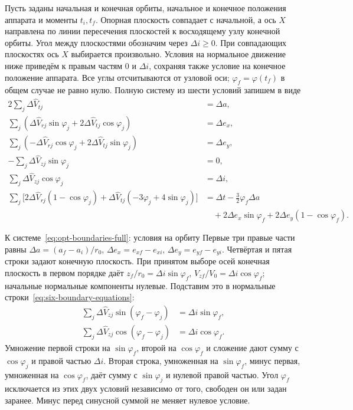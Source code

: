 Пусть заданы начальная и конечная орбиты, начальное и конечное
положения аппарата и моменты $t_i,t_f$.
Опорная плоскость совпадает с начальной, а ось $X$ направлена
по линии пересечения плоскостей к восходящему узлу конечной орбиты.
Угол между плоскостями обозначим через $\Delta i\geq0$.
При совпадающих плоскостях ось $X$ выбирается произвольно.
Условия на нормальное движение ниже приведём к правым частям
$0$ и $\Delta i$, сохраняя также условие на конечное положение аппарата.
Все углы отсчитываются от узловой оси;
$\varphi_f=\varphi(t_f)$ в общем случае не равно нулю.
Полную систему из шести условий запишем в виде
\begin{equation}
\begin{aligned}
 2\sum_j\Delta\widehat V_{tj}&=\Delta a,\\
 \sum_j(\Delta\widehat V_{rj}\sin\varphi_j+
              2\Delta\widehat V_{tj}\cos\varphi_j)&=\Delta e_x,\\
 \sum_j(-\Delta\widehat V_{rj}\cos\varphi_j+
              2\Delta\widehat V_{tj}\sin\varphi_j)&=\Delta e_y,\\
 -\sum_j\Delta\widehat V_{zj}\sin\varphi_j
       &=0,\\
 \sum_j\Delta\widehat V_{zj}\cos\varphi_j
       &=\Delta i,\\
 \sum_j\bigl[2\Delta\widehat V_{rj}(1-\cos\varphi_j)
       +\Delta\widehat V_{tj}(-3\varphi_j+4\sin\varphi_j)\bigr]
       &=\Delta t-\frac32\varphi_f\Delta a\\
       &\quad+2\Delta e_x\sin\varphi_f
                   +2\Delta e_y(1-\cos\varphi_f).
\end{aligned}
\label{eq:opt-boundaries-full}
\end{equation}
\begin{explanation}{К системе~\eqref{eq:opt-boundaries-full}: условия на орбиту}
Первые три правые части равны
$\Delta a=(a_f-a_i)/r_0$, $\Delta e_x=e_{xf}-e_{xi}$,
$\Delta e_y=e_{yf}-e_{yi}$.
Четвёртая и пятая строки задают конечную плоскость.
При принятом выборе осей конечная плоскость в первом порядке даёт
$z_f/r_0=\Delta i\sin\varphi_f$,
$V_{zf}/V_0=\Delta i\cos\varphi_f$; начальные нормальные компоненты нулевые.
Подставим это в нормальные строки~\eqref{eq:six-boundary-equations}:
\[
\begin{aligned}
\sum_j\Delta\widehat V_{zj}\sin(\varphi_f-\varphi_j)
 &=\Delta i\sin\varphi_f,\\
\sum_j\Delta\widehat V_{zj}\cos(\varphi_f-\varphi_j)
 &=\Delta i\cos\varphi_f.
\end{aligned}
\]
Умножение первой строки на $\sin\varphi_f$, второй на
$\cos\varphi_f$ и сложение дают сумму с $\cos\varphi_j$
и правой частью $\Delta i$.
Вторая строка, умноженная на $\sin\varphi_f$, минус первая,
умноженная на $\cos\varphi_f$, даёт сумму с $\sin\varphi_j$
и нулевой правой частью. Угол $\varphi_f$ исключается из этих двух
условий независимо от того, свободен он или задан заранее.
Минус перед синусной суммой не меняет нулевое условие.
\end{explanation}

